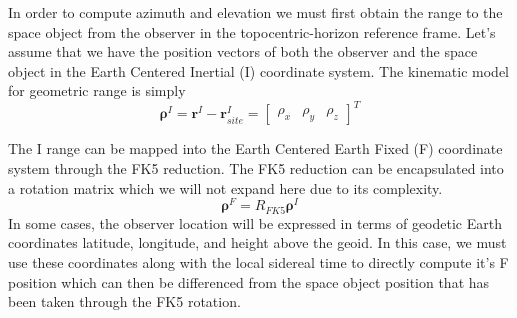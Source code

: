 In order to compute azimuth and elevation we must first obtain the
range to the space object from the observer in the
topocentric-horizon reference frame. Let's assume that we have the
position vectors of both the observer and the space object in the
Earth Centered Inertial (I) coordinate system. The kinematic model
for geometric range is simply
%
\begin{equation}
    \boldsymbol\rho^{I} =  \mathbf{r}^{I} - \mathbf{r}^{I}_{site} = \begin{bmatrix} \rho_x & \rho_y & \rho_z \end{bmatrix}^T
\end{equation}

The I range can be mapped into the Earth Centered Earth Fixed (F)
coordinate system through the FK5 reduction. The FK5 reduction can
be encapsulated into a rotation matrix which we will not expand here
due to its complexity.
\begin{equation}
\boldsymbol\rho^{F}  = R_{FK5}\boldsymbol\rho^{I}\label{eq:FK5rot}
\end{equation}
In some cases, the observer location will be expressed in terms of
geodetic Earth coordinates latitude, longitude, and height above the
geoid. In this case, we must use these coordinates along with the
local sidereal time to directly compute it's F position which can
then be differenced from the space object position that has been
taken through the FK5 rotation.

